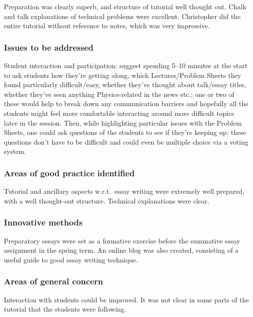 Preparation was clearly superb, and structure of tutorial well thought out. Chalk and talk explanations of technical problems were excellent. Christopher did the entire tutorial without reference to notes, which was very impressive.

\subsubsection{Issues to be addressed}\label{sec:B-issues}

Student interaction and participation: suggest spending 5--10 minutes at the start to ask students how they're getting along, which Lectures/Problem Sheets they found particularly difficult/easy, whether they've thought about talk/essay titles, whether they've seen anything Physics-related in the news etc.; one or two of these would help to break down any communication barriers and hopefully all the students might feel more comfortable interacting around more difficult topics later in the session. Then, while highlighting particular issues with the Problem Sheets, one could ask questions of the students to see if they're keeping up: these questions don't have to be difficult and could even be multiple choice via a voting system.

\subsubsection{Areas of good practice identified}

Tutorial and ancillary aspects w.r.t.\ essay writing were extremely well prepared, with a well thought-out structure. Technical explanations were clear.

\subsubsection{Innovative methods}

Preparatory essays were set as a formative exercise before the summative essay assignment in the spring term. An online blog was also created, consisting of a useful guide to good essay writing technique.

\subsubsection{Areas of general concern}\label{sec:B-concern}

Interaction with students could be improved. It was not clear in some parts of the tutorial that the students were following.

